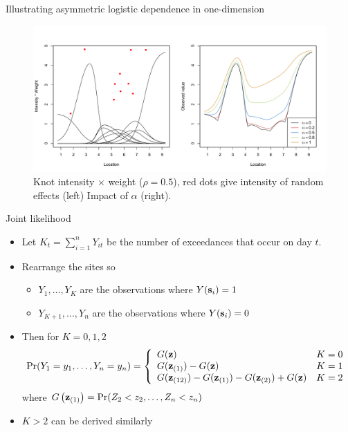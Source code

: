 \documentclass{beamer}
\begin{document}
\begin{frame}{Illustrating asymmetric logistic dependence in one-dimension}
  \centering
  \begin{figure}
    \includegraphics[width=\linewidth, trim=0 0.5in 0 0]{./plots/max-stable.pdf}
    \caption{Knot intensity $\times$ weight ($\rho = 0.5$), red dots give intensity of random effects (left) Impact of $\alpha$ (right).}
   \end{figure}
\end{frame}

\begin{frame}{Joint likelihood}
  \begin{itemize} \setlength{\itemsep}{1em}
    \item Let $K_t = \sum_{i = 1}^n Y_{it}$ be the number of exceedances that occur on day $t$.
    \item Rearrange the sites so
    \begin{itemize}
      \item $Y_1, \ldots, Y_K$ are the observations where $Y(\mbox{\bf s}_i) = 1$
      \item $Y_{K+1}, \ldots, Y_n$ are the observations where $Y(\mbox{\bf s}_i) = 0$
    \end{itemize}
    \item Then for $K = 0, 1, 2$
    {\scriptsize
    \begin{align*}
      \Pr(Y_1 = y_1, \ldots, Y_n = y_n) = \left\{ \begin{array}{ll}
        G(\mbox{\bf z})  & K = 0\\
        G(\mbox{\bf z}_{(1)}) - G(\mbox{\bf z}) & K = 1\\
        G(\mbox{\bf z}_{(12)}) - G(\mbox{\bf z}_{(1)}) - G(\mbox{\bf z}_{(2)}) + G(\mbox{\bf z}) & K =2
      \end{array}\right.
    \end{align*}
    }
    where $G\left(\mbox{\bf z}_{(1)}\right) = \Pr(Z_2 < z_2, \ldots, Z_n < z_n)$
    \item $K > 2$ can be derived similarly
  \end{itemize}
\end{frame}
\end{document}
